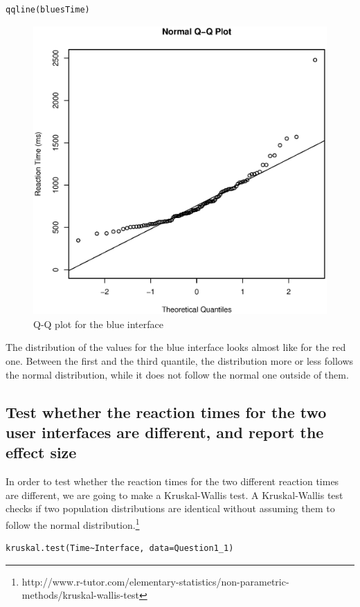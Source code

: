 \documentclass[12pt,a4paper]{scrartcl}
\begin{document}
\begin{lstlisting}[frame=single]
qqline(bluesTime)
\end{lstlisting}
\begin{figure}[H]
\includegraphics[scale=0.7]{QQPlotBlue.eps}
\centering
\caption{Q-Q plot for the blue interface}
\end{figure}

The distribution of the values for the blue interface looks almost like for the red one. Between the first and the third quantile, the distribution more or less follows the normal distribution, while it does not follow the normal one outside of them.

\subsection{Test whether the reaction times for the two user interfaces are different, and report the effect size}

In order to test whether the reaction times for the two different reaction times are different, we are going to make a Kruskal-Wallis test. A Kruskal-Wallis test checks if two population distributions are identical without assuming them to follow the normal distribution.\footnote{http://www.r-tutor.com/elementary-statistics/non-parametric-methods/kruskal-wallis-test}
\begin{lstlisting}[frame=single]
kruskal.test(Time~Interface, data=Question1_1)
\end{lstlisting}
\end{document}
